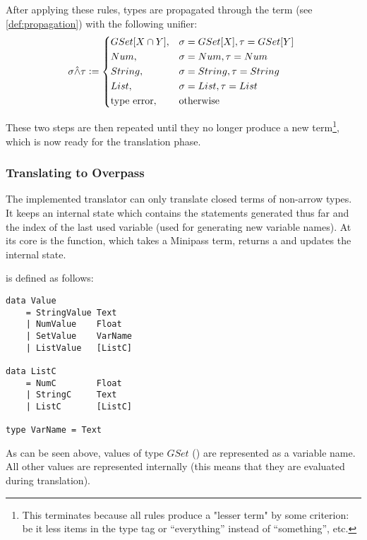 \documentclass[main.tex]{subfiles}
\begin{document}
After applying these rules, types are propagated through the term
(see \cref{def:propagation}) with the following unifier:
\[
    \sigma \unify \tau \defeq
    \begin{cases*}
        GSet[X \cap Y] ,& $\sigma = GSet[X], \tau = GSet[Y]$ \\
        Num ,& $\sigma = Num, \tau = Num$ \\
        String ,& $\sigma = String, \tau = String$ \\
        List ,& $\sigma = List, \tau = List$ \\
        \text{type error} ,& otherwise \\
    \end{cases*}
\]

These two steps are then repeated until they no longer produce a new term\footnote{
    This terminates because all rules produce a "lesser term" by some criterion:
    be it less items in the type tag or ``everything'' instead of ``something'', etc.
}, which is now ready for the translation phase.


\subsubsection{Translating to Overpass}\label{sec:translation}
The implemented translator can only translate closed terms of non-arrow types.
It keeps an internal state which contains the statements generated thus far
and the index of the last used variable (used for generating new variable
names).
At its core is the  function, which takes a Minipass term,
returns a  and updates the internal state.

 is defined as follows:
\begin{lstwrap}\begin{lstlisting}
data Value
    = StringValue Text
    | NumValue    Float
    | SetValue    VarName
    | ListValue   [ListC]

data ListC
    = NumC        Float
    | StringC     Text
    | ListC       [ListC]

type VarName = Text
\end{lstlisting}\end{lstwrap}

As can be seen above, values of type $GSet$ () are represented
as a variable name. All other values are represented internally (this means
that they are evaluated during translation).
\end{document}
